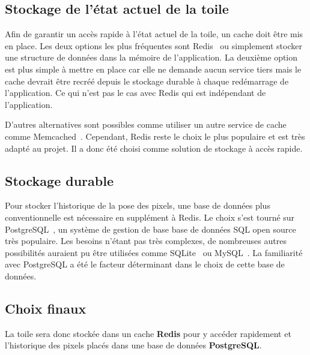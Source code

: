 \subsection{Stockage de l'état actuel de la toile}

Afin de garantir un accès rapide à l'état actuel de la toile, un cache doit être mis en place. Les deux options les plus fréquentes sont Redis~\cite{redis} ou simplement stocker une structure de données dans la mémoire de l'application. La deuxième option est plus simple à mettre en place car elle ne demande aucun service tiers mais le cache devrait être recréé depuis le stockage durable à chaque redémarrage de l'application. Ce qui n'est pas le cas avec Redis qui est indépendant de l'application.

D'autres alternatives sont possibles comme utiliser un autre service de cache comme Memcached~\cite{memcached}. Cependant, Redis reste le choix le plus populaire et est très adapté au projet. Il a donc été choisi comme solution de stockage à accès rapide.

\subsection{Stockage durable}

Pour stocker l'historique de la pose des pixels, une base de données plus conventionnelle est nécessaire en supplément à Redis. Le choix s'est tourné sur PostgreSQL~\cite{postgresql}, un système de gestion de base base de données SQL open source très populaire. Les besoins n'étant pas très complexes, de nombreuses autres possibilités auraient pu être utilisées comme SQLite~\cite{sqlite} ou MySQL~\cite{mysql}. La familiarité avec PostgreSQL a été le facteur déterminant dans le choix de cette base de données.

\subsection{Choix finaux}

La toile sera donc stockée dans un cache \textbf{Redis} pour y accéder rapidement et l'historique des pixels placés dans une base de données \textbf{PostgreSQL}.
